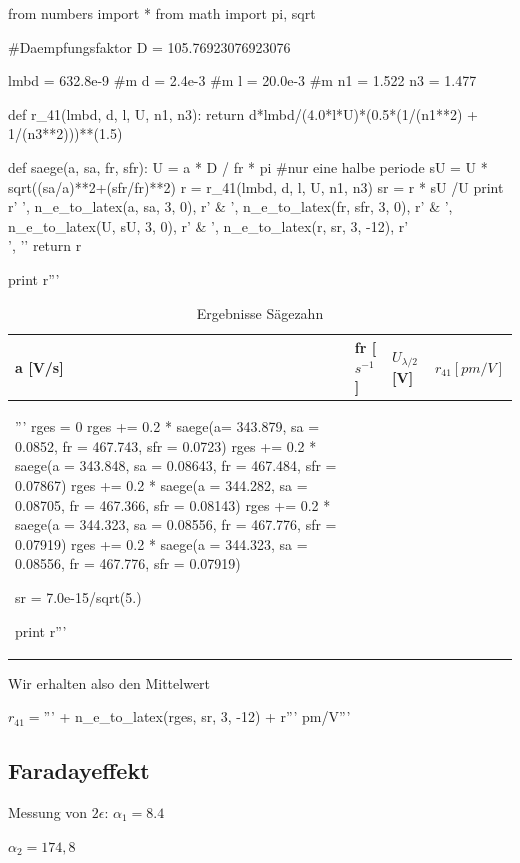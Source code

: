 \begin{python}
from numbers import *
from math import pi, sqrt

#Daempfungsfaktor
D = 105.76923076923076

lmbd = 632.8e-9 #m
d = 2.4e-3 #m
l = 20.0e-3 #m
n1 = 1.522
n3 = 1.477

def r_41(lmbd, d, l, U, n1, n3):
  return d*lmbd/(4.0*l*U)*(0.5*(1/(n1**2) + 1/(n3**2)))**(1.5)

def saege(a, sa, fr, sfr):
  U = a * D / fr * pi #nur eine halbe periode
  sU = U * sqrt((sa/a)**2+(sfr/fr)**2)
  r = r_41(lmbd, d, l, U, n1, n3)
  sr = r * sU /U
  print r' ', n_e_to_latex(a, sa, 3, 0), r' & ', n_e_to_latex(fr, sfr, 3, 0), r' & ', n_e_to_latex(U, sU, 3, 0), r' & ', n_e_to_latex(r, sr, 3, -12), r'\\', '\n'
  return r

print r'''\begin{table}[H]
 \centering
 \begin{tabular}{llll}
  \toprule
  a [V/s]  &  fr [ $s^{-1}$] & $U_{\lambda/2}$ [V] & $r_{41} [pm/V]$ \\
  \midrule
'''
rges = 0
rges += 0.2 * saege(a= 343.879, sa = 0.0852, fr = 467.743, sfr = 0.0723)
rges += 0.2 * saege(a = 343.848, sa = 0.08643, fr = 467.484, sfr = 0.07867)
rges += 0.2 * saege(a = 344.282, sa = 0.08705, fr = 467.366, sfr = 0.08143)
rges += 0.2 * saege(a = 344.323, sa = 0.08556, fr = 467.776, sfr = 0.07919)
rges += 0.2 * saege(a = 344.323, sa = 0.08556, fr = 467.776, sfr = 0.07919)

sr = 7.0e-15/sqrt(5.)

print r'''
\bottomrule

\end{tabular}
\caption{Ergebnisse S\"agezahn}
\end{table}

Wir erhalten also den Mittelwert

$r_{41} = $''' +  n_e_to_latex(rges, sr, 3, -12) + r''' pm/V'''

\end{python}



\subsection{Faradayeffekt}

Messung von $2\epsilon$:
$\alpha_1 = 8.4$

$\alpha_2 = 174,8$

